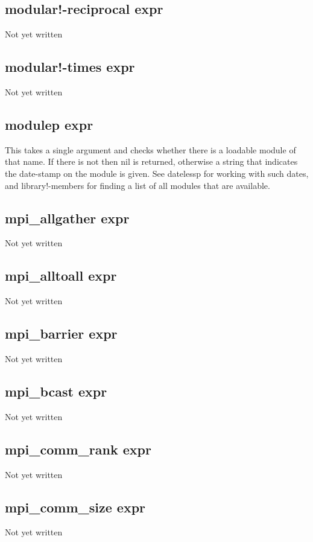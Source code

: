 \documentclass[a4paper,11pt]{article}
\begin{document}
\subsection{\ttfamily modular!-reciprocal expr}
Not yet written

\subsection{\ttfamily modular!-times expr}
Not yet written

\subsection{\ttfamily modulep expr}
This takes a single argument and checks whether there is a loadable module
of that name. If there is not then {\ttfamily nil} is returned, otherwise a
string that indicates the date-stamp on the module is given. See
{\ttfamily datelessp} for working with such dates, and {\ttfamily
library!-members} for finding a list of all modules that are available.

\subsection{\ttfamily mpi\_allgather expr}
Not yet written

\subsection{\ttfamily mpi\_alltoall expr}
Not yet written

\subsection{\ttfamily mpi\_barrier expr}
Not yet written

\subsection{\ttfamily mpi\_bcast expr}
Not yet written

\subsection{\ttfamily mpi\_comm\_rank expr}
Not yet written

\subsection{\ttfamily mpi\_comm\_size expr}
Not yet written
\end{document}

